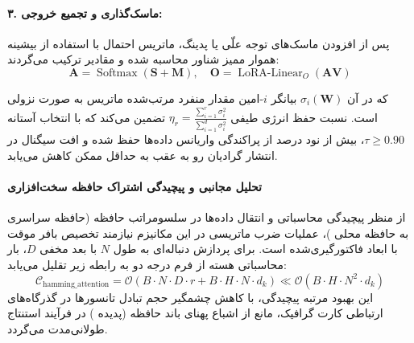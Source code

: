 \paragraph{۳. ماسک‌گذاری و تجمیع خروجی:}
پس از افزودن ماسک‌های توجه علّی یا پدینگ، ماتریس احتمال با استفاده از بیشینه هموار ممیز شناور محاسبه شده و مقادیر ترکیب می‌گردند:
\begin{equation}
\mathbf{A} = \operatorname{Softmax}\left(\mathbf{S} + \mathbf{M}\right), \quad \mathbf{O} = \operatorname{LoRA-Linear}_O(\mathbf{A} \mathbf{V})
\end{equation}

که در آن $\sigma_i(\mathbf{W})$ بیانگر $i$-امین مقدار منفرد مرتب‌شده ماتریس به صورت نزولی است. نسبت حفظ انرژی طیفی $\eta_r = \frac{\sum_{i=1}^r \sigma_i^2}{\sum_{i=1}^{d} \sigma_i^2}$ تضمین می‌کند که با انتخاب آستانه $\tau \ge 0.90$، بیش از نود درصد از پراکندگی واریانس داده‌ها حفظ شده و افت سیگنال در انتشار گرادیان رو به عقب به حداقل ممکن کاهش می‌یابد.

\paragraph{تحلیل مجانبی و پیچیدگی اشتراک حافظه سخت‌افزاری}
از منظر پیچیدگی محاسباتی و انتقال داده‌ها در سلسومراتب حافظه (حافظه سراسری  به حافظه محلی )، عملیات ضرب ماتریسی در این مکانیزم نیازمند تخصیص بافر موقت با ابعاد فاکتورگیری‌شده است. برای پردازش دنباله‌ای به طول $N$ با بعد مخفی $D$، بار محاسباتی هسته از فرم درجه دو به رابطه زیر تقلیل می‌یابد:
\begin{equation}
\label{eq:complexity_hamming_attention}
\mathcal{C}_{\text{hamming\_attention}} = \mathcal{O}\left( B \cdot N \cdot D \cdot r + B \cdot H \cdot N \cdot d_k \right) \ll \mathcal{O}\left( B \cdot H \cdot N^2 \cdot d_k \right)
\end{equation}
این بهبود مرتبه پیچیدگی، با کاهش چشمگیر حجم تبادل تانسورها در گذرگاه‌های ارتباطی کارت گرافیک، مانع از اشباع پهنای باند حافظه (پدیده ) در فرآیند استنتاج طولانی‌مدت می‌گردد.
